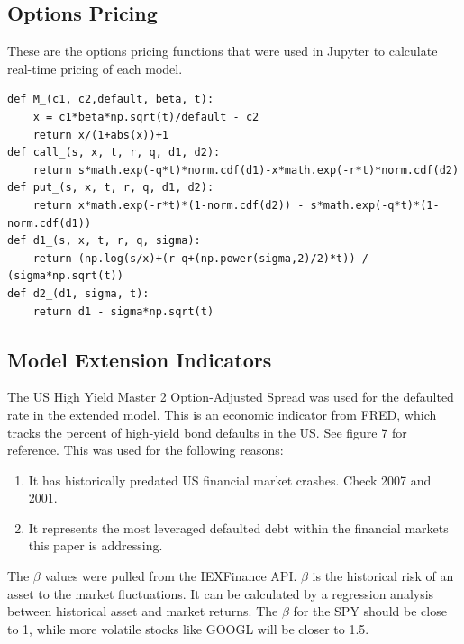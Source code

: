 \documentclass{article}
\begin{document}
\subsection{Options Pricing}
\begin{flushleft}
These are the options pricing functions that were used in Jupyter to calculate real-time pricing of each model. 
\begin{verbatim}
def M_(c1, c2,default, beta, t):
    x = c1*beta*np.sqrt(t)/default - c2
    return x/(1+abs(x))+1
def call_(s, x, t, r, q, d1, d2):
    return s*math.exp(-q*t)*norm.cdf(d1)-x*math.exp(-r*t)*norm.cdf(d2)
def put_(s, x, t, r, q, d1, d2):
    return x*math.exp(-r*t)*(1-norm.cdf(d2)) - s*math.exp(-q*t)*(1-norm.cdf(d1))
def d1_(s, x, t, r, q, sigma):
    return (np.log(s/x)+(r-q+(np.power(sigma,2)/2)*t)) / (sigma*np.sqrt(t))
def d2_(d1, sigma, t):
    return d1 - sigma*np.sqrt(t)
\end{verbatim}
\end{flushleft}

\subsection{Model Extension Indicators}
\begin{flushleft}
The US High Yield Master 2 Option-Adjusted Spread was used for the defaulted rate in the extended model. This is an economic indicator from FRED, which tracks the percent of high-yield bond defaults in the US. See figure 7 for reference. 
\newline\newline
This was used for the following reasons: 
\begin{enumerate}
\item It has historically predated US financial market crashes. Check 2007 and 2001. 
\item It represents the most leveraged defaulted debt within the financial markets this paper is addressing. 
\end{enumerate}
The $\beta$ values were pulled from the IEXFinance API. $\beta$ is the historical risk of an asset to the market fluctuations. It can be calculated by a regression analysis between historical asset and market returns. The $\beta$ for the SPY should be close to 1, while more volatile stocks like GOOGL will be closer to 1.5. 
\end{flushleft}
\end{document}

